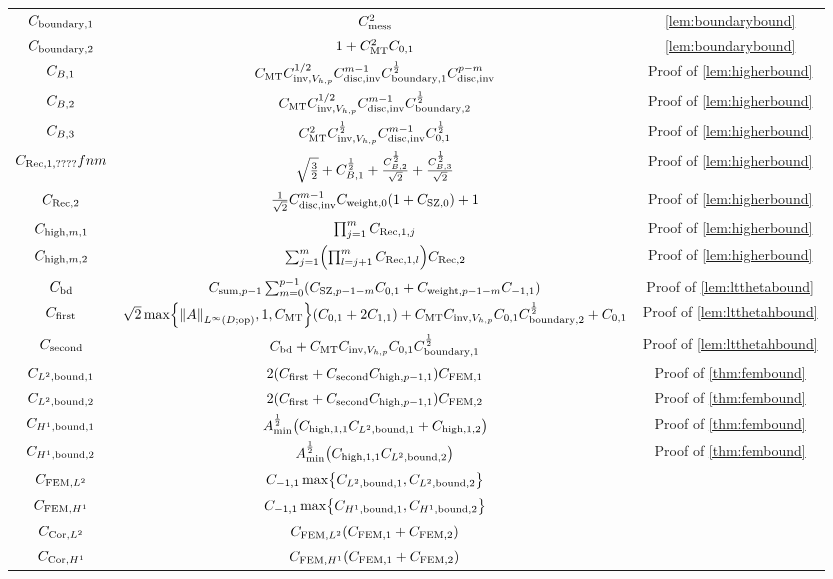 \begin{longtabu}{ccc}
  $C_{\mathrm{boundary},1}$ & $C_{\mathrm{mess}}^2$ & \cref{lem:boundarybound} \\
  $C_{\mathrm{boundary},2}$ & $1 + C_{\mathrm{MT}}^2 C_{0,1}$ & \cref{lem:boundarybound}\\
  $C_{B,1}$&$C_{\mathrm{MT}} C_{\mathrm{inv},V_{h,p}}^{1/2} C_{\mathrm{disc},\mathrm{inv}}^{m-1} C_{\mathrm{boundary},1}^{\frac{1}{2}} C_{\mathrm{disc},\mathrm{inv}}^{p-m}$&Proof of \cref{lem:higherbound}\\
  $C_{B,2}$&$C_{\mathrm{MT}} C_{\mathrm{inv},V_{h,p}}^{1/2} C_{\mathrm{disc},\mathrm{inv}}^{m-1} C_{\mathrm{boundary},2}^{\frac{1}{2}}$&Proof of \cref{lem:higherbound}\\
  $C_{B,3}$&$C_{\mathrm{MT}}^2 C_{\mathrm{inv},V_{h,p}}^{\frac{1}{2}} C_{\mathrm{disc},\mathrm{inv}}^{m-1}C_{0,1}^{\frac{1}{2}}$&Proof of \cref{lem:higherbound}\\
  $C_{\mathrm{Rec},1,????}fn{m}$&$\sqrt{\frac32} + C_{B,1}^{\frac{1}{2}} + \frac{C_{B,2}^{\frac{1}{2}}}{\sqrt{2}}+ \frac{C_{B,3}^{\frac{1}{2}}}{\sqrt{2}}$&Proof of \cref{lem:higherbound}\\
  $C_{\mathrm{Rec},2}$&$\frac1{\sqrt{2}}\Chinv^{m-1}\Cwfn{0}\mleft(1+\CSZfn{0}\mright)+1$&Proof of \cref{lem:higherbound}\\
  $C_{\mathrm{high},m,1}$ & $\prod_{j=1}^mC_{\mathrm{Rec},1,j}$&Proof of \cref{lem:higherbound}\\
  $C_{\mathrm{high},m,2}$ &$\sum_{j=1}^{m} \mleft(\prod_{l=j+1}^m \CRecofn{l}\mright) \CRect$&Proof of \cref{lem:higherbound}\\
  $C_{\mathrm{bd}}$ &$\Csumfn{p-1}\sum_{m=0}^{p-1} \mleft(\CSZfn{p-1-m}\Cfn{0,1} + \Cwfn{p-1-m} \Cfn{-1,1}\mright)$&Proof of \cref{lem:ltthetabound}\\
  $C_{\mathrm{first}}$ &$\sqrt{2}\max\set{\NLiDop{A},1,\CMT}\mleft(\Cfn{0,1} + 2\Cfn{1,1}\mright) + \CMT \CinvVhp \Cfn{0,1} \Cboundaryt^{\half} + \Cfn{0,1}$&Proof of \cref{lem:ltthetahbound}\\
    $C_{\mathrm{second}}$ &$C_{\mathrm{bd}}  + C_{\mathrm{MT}} C_{\mathrm{inv},V_{h,p}} C_{0,1}C_{\mathrm{boundary},1}^{\frac{1}{2}}$&Proof of \cref{lem:ltthetahbound}\\
  $C_{L^{2},\mathrm{bound},1}$&$ 2\mleft(\Cfirst + \Csecond\Chighfn{p-1,1}\mright)\CFEMo$&Proof of \cref{thm:fembound}\\
  $C_{L^{2},\mathrm{bound},2}$&$2\mleft(\Cfirst + \Csecond\Chighfn{p-1,1}\mright)\CFEMt$&Proof of \cref{thm:fembound}\\
  $C_{H^{1},\mathrm{bound},1}$&$\Amin^{\half} \mleft(\Chighfn{1,1}\CLtboundo + \Chighfn{1,2}\mright)$&Proof of \cref{thm:fembound}\\
  $C_{H^{1},\mathrm{bound},2}$&$\Amin^{\half} \mleft(\Chighfn{1,1}\CLtboundt\mright)$&Proof of \cref{thm:fembound}\\
  $C_{\mathrm{FEM},L^{2}}$&$\Cfn{-1,1} \max\set{\CLtboundo,\CLtboundt}$&\\
  $C_{\mathrm{FEM},H^{1}}$&$ \Cfn{-1,1}\max\set{\CHoboundo,\CHoboundt}$&\\
  $C_{\mathrm{Cor},L^{2}}$&$\CFEMLt\mleft(\CFEMo+\CFEMt\mright)$&\\
  $C_{\mathrm{Cor},H^{1}}$&$\CFEMHo\mleft(\CFEMotilde+\CFEMttilde\mright)$&\\
\bottomrule
\end{longtabu}
